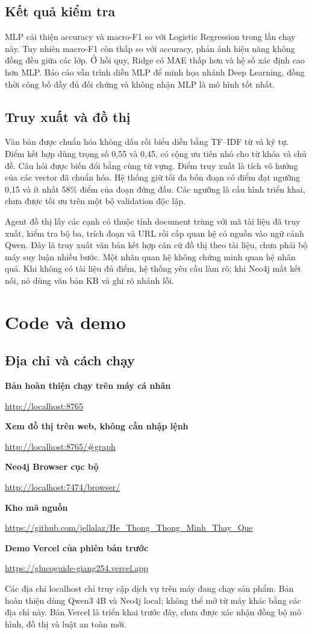 \section{Kết quả kiểm tra}

MLP cải thiện accuracy và macro-F1 so với Logistic Regression trong lần chạy này. Tuy nhiên macro-F1 còn thấp so với accuracy, phản ánh hiệu năng không đồng đều giữa các lớp. Ở hồi quy, Ridge có MAE thấp hơn và hệ số xác định cao hơn MLP. Báo cáo vẫn trình diễn MLP để minh họa nhánh Deep Learning, đồng thời công bố đầy đủ đối chứng và không nhận MLP là mô hình tốt nhất.
\section{Truy xuất và đồ thị}
Văn bản được chuẩn hóa không dấu rồi biểu diễn bằng TF--IDF từ và ký tự. Điểm kết hợp dùng trọng số 0,55 và 0,45, có cộng ưu tiên nhỏ cho từ khóa và chủ đề. Câu hỏi được biến đổi bằng cùng từ vựng. Điểm truy xuất là tích vô hướng của các vector đã chuẩn hóa. Hệ thống giữ tối đa bốn đoạn có điểm đạt ngưỡng 0,15 và ít nhất 58\% điểm của đoạn đứng đầu. Các ngưỡng là cấu hình triển khai, chưa được tối ưu trên một bộ validation độc lập.

Agent đồ thị lấy các cạnh có thuộc tính document trùng với mã tài liệu đã truy xuất, kiểm tra bộ ba, trích đoạn và URL rồi cấp quan hệ có nguồn vào ngữ cảnh Qwen. Đây là truy xuất văn bản kết hợp căn cứ đồ thị theo tài liệu, chưa phải bộ máy suy luận nhiều bước. Một nhãn quan hệ không chứng minh quan hệ nhân quả. Khi không có tài liệu đủ điểm, hệ thống yêu cầu làm rõ; khi Neo4j mất kết nối, nó dùng văn bản KB và ghi rõ nhánh lỗi.
\chapter{Code và demo}
\section{Địa chỉ và cách chạy}
\noindent\textbf{Bản hoàn thiện chạy trên máy cá nhân}\par
\noindent\url{http://localhost:8765}\par\medskip
\noindent\textbf{Xem đồ thị trên web, không cần nhập lệnh}\par
\noindent\url{http://localhost:8765/\#graph}\par\medskip
\noindent\textbf{Neo4j Browser cục bộ}\par
\noindent\url{http://localhost:7474/browser/}\par\medskip
\noindent\textbf{Kho mã nguồn}\par
\noindent\url{https://github.com/jellalaz/He_Thong_Thong_Minh_Thay_Que}\par\medskip
\noindent\textbf{Demo Vercel của phiên bản trước}\par
\noindent\url{https://glucoguide-giang254.vercel.app}\par\medskip
Các địa chỉ localhost chỉ truy cập dịch vụ trên máy đang chạy sản phẩm. Bản hoàn thiện dùng Qwen3 4B và Neo4j local; không thể mở từ máy khác bằng các địa chỉ này. Bản Vercel là triển khai trước đây, chưa được xác nhận đồng bộ mô hình, đồ thị và luật an toàn mới.


